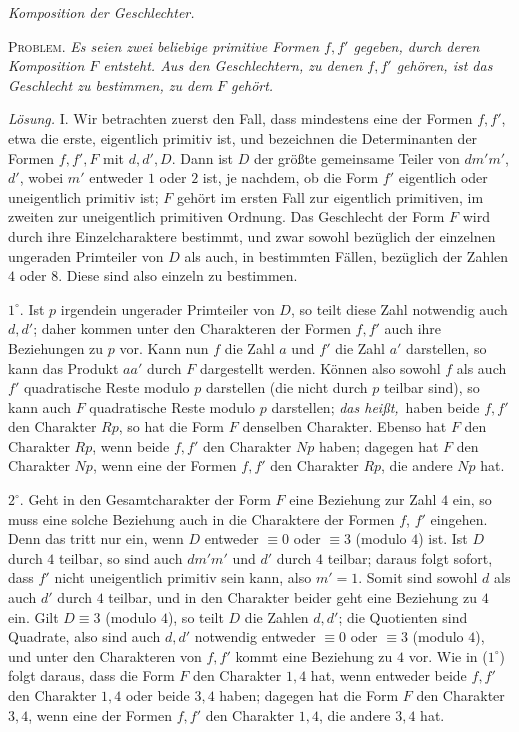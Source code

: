 \begin{center}
\textit{Komposition der Geschlechter.}
\end{center}

\textsc{Problem.} \textit{Es seien zwei beliebige primitive Formen $f,f'$ gegeben, durch deren Komposition $F$ entsteht. Aus den Geschlechtern, zu denen $f,f'$ gehören, ist das Geschlecht zu bestimmen, zu dem $F$ gehört.}

\textit{Lösung.} I. Wir betrachten zuerst den Fall, dass mindestens eine der Formen $f,f'$, etwa die erste, eigentlich primitiv ist, und bezeichnen die Determinanten der Formen $f,f',F$ mit $d,d',D$. Dann ist $D$ der größte gemeinsame Teiler von $dm'm'$, $d'$, wobei $m'$ entweder $1$ oder $2$ ist, je nachdem, ob die Form $f'$ eigentlich oder uneigentlich primitiv ist; $F$ gehört im ersten Fall zur eigentlich primitiven, im zweiten zur uneigentlich primitiven Ordnung. Das Geschlecht der Form $F$ wird durch ihre Einzelcharaktere bestimmt, und zwar sowohl bezüglich der einzelnen ungeraden Primteiler von $D$ als auch, in bestimmten Fällen, bezüglich der Zahlen $4$ oder $8$. Diese sind also einzeln zu bestimmen.

$1^{\circ}$. Ist $p$ irgendein ungerader Primteiler von $D$, so teilt diese Zahl notwendig auch $d,d'$; daher kommen unter den Charakteren der Formen $f,f'$ auch ihre Beziehungen zu $p$ vor. Kann nun $f$ die Zahl $a$ und $f'$ die Zahl $a'$ darstellen, so kann das Produkt $aa'$ durch $F$ dargestellt werden. Können also sowohl $f$ als auch $f'$ quadratische Reste modulo $p$ darstellen (die nicht durch $p$ teilbar sind), so kann auch $F$ quadratische Reste modulo $p$ darstellen; \textit{das heißt,}\ haben beide $f,f'$ den Charakter $Rp$, so hat die Form $F$ denselben Charakter. Ebenso hat $F$ den Charakter $Rp$, wenn beide $f,f'$ den Charakter $Np$ haben; dagegen hat $F$ den Charakter $Np$, wenn eine der Formen $f,f'$ den Charakter $Rp$, die andere $Np$ hat.

$2^{\circ}$. Geht in den Gesamtcharakter der Form $F$ eine Beziehung zur Zahl $4$ ein, so muss eine solche Beziehung auch in die Charaktere der Formen $f$, $f'$ eingehen. Denn das tritt nur ein, wenn $D$ entweder $\equiv0$ oder $\equiv3$ (modulo $4$) ist. Ist $D$ durch $4$ teilbar, so sind auch $dm'm'$ und $d'$ durch $4$ teilbar; daraus folgt sofort, dass $f'$ nicht uneigentlich primitiv sein kann, also $m'=1$. Somit sind sowohl $d$ als auch $d'$ durch $4$ teilbar, und in den Charakter beider geht eine Beziehung zu $4$ ein. Gilt $D\equiv3$ (modulo $4$), so teilt $D$ die Zahlen $d,d'$; die Quotienten sind Quadrate, also sind auch $d,d'$ notwendig entweder $\equiv0$ oder $\equiv3$ (modulo $4$), und unter den Charakteren von $f,f'$ kommt eine Beziehung zu $4$ vor. Wie in ($1^{\circ}$) folgt daraus, dass die Form $F$ den Charakter $1,4$ hat, wenn entweder beide $f,f'$ den Charakter $1,4$ oder beide $3,4$ haben; dagegen hat die Form $F$ den Charakter $3,4$, wenn eine der Formen $f,f'$ den Charakter $1,4$, die andere $3,4$ hat.


